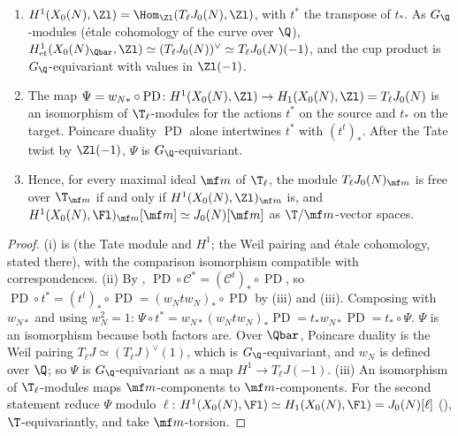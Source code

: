 \begin{proposition}\label{prop:moddeg:tate-module-vs-h1}
\leavevmode
\begin{enumerate}[label=(\roman*)]
\item $H^1(X_0(N),\Zl)=\Hom_{\Zl}(T_\ell J_0(N),\Zl)$, with $t^*$ the transpose of $t_*$. As $G_\Q$-modules (\'etale cohomology of the curve over $\Q$),
$H^1_{\mathrm{et}}(X_0(N)_{\Qbar},\Zl)\simeq(T_\ell J_0(N))^\vee\simeq T_\ell J_0(N)(-1)$, and the cup product is $G_\Q$-equivariant with values in $\Zl(-1)$.
\item The map $\Psi=w_{N*}\circ\operatorname{PD}\colon H^1(X_0(N),\Zl)\to H_1(X_0(N),\Zl)=T_\ell J_0(N)$ is an isomorphism of $\T_\ell$-modules for the actions $t^*$ on the source and
$t_*$ on the target. Poincare duality $\operatorname{PD}$ alone intertwines $t^*$ with $(t^t)_*$. After the Tate twist by $\Zl(-1)$, $\Psi$ is $G_\Q$-equivariant.
\item Hence, for every maximal ideal $\mf m$ of $\T_\ell$, the module $T_\ell J_0(N)_{\mf m}$ is free over $\T_{\mf m}$ if and only if $H^1(X_0(N),\Zl)_{\mf m}$ is, and
$H^1(X_0(N),\Fl)_{\mf m}[\mf m]\simeq J_0(N)[\mf m]$ as $\T/\mf m$-vector spaces.
\end{enumerate}
\end{proposition}

\begin{proof}
(i) is  (the Tate module and $H^1$; the Weil pairing and \'etale cohomology, stated there), with the comparison isomorphism compatible with correspondences.
(ii) By , $\operatorname{PD}\circ\mathcal C^*=(\mathcal C^t)_*\circ\operatorname{PD}$, so $\operatorname{PD}\circ t^*=(t^t)_*\circ\operatorname{PD}=(w_Ntw_N)_*\circ\operatorname{PD}$ by
(iii) and (iii). Composing with $w_{N*}$ and using $w_N^2=1$: $\Psi\circ t^*=w_{N*}(w_Ntw_N)_*\operatorname{PD}=t_*w_{N*}\operatorname{PD}=t_*\circ\Psi$.
$\Psi$ is an isomorphism because both factors are. Over $\Qbar$, Poincare duality is the Weil pairing $T_\ell J\simeq(T_\ell J)^\vee(1)$, which is $G_\Q$-equivariant, and $w_N$ is defined over
$\Q$; so $\Psi$ is $G_\Q$-equivariant as a map $H^1\to T_\ell J(-1)$. (iii) An isomorphism of $\T_\ell$-modules maps $\mf m$-components to $\mf m$-components. For the second
statement reduce $\Psi$ modulo $\ell$: $H^1(X_0(N),\Fl)\simeq H_1(X_0(N),\Fl)=J_0(N)[\ell]$ (), $\T$-equivariantly, and take $\mf m$-torsion.
\end{proof}

